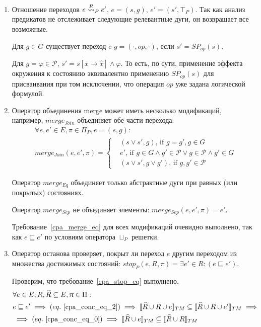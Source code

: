 \begin{enumerate}
\item Отношение переходов $e \stackrel{R}{\leadsto}_P e'$, $e = (s, g)$, $e' = (s', \top_P)$. 
Так как анализ предикатов не отслеживает следующие релевантные дуги, он возвращает все возможные. 

Для $g \in G$ существует переход c $g = (\cdot, op, \cdot)$, если $s' = SP_{op}(s)$.

Для $g = \varphi \in \mathscr{P}$, $s' = s[x \rightarrow \hat x] \land \varphi$.
То есть, по сути, применение эффекта окружения к состоянию эквивалентно применению $SP_{op}(s)$ для присваивания при том исключении, что операция $op$ уже задана логической формулой.

\item 
Оператор объединения merge может иметь несколько модификаций, например,
$merge_{Join}$ объединяет обе части перехода:
\begin{equation}
\label{predicate_merge_join_def}
\begin{aligned}
& \forall e, e' \in E, \pi \in \Pi_P, e =(s,g): \\
& merge_{Join}(e, e', \pi) = 
\begin{cases}
& (s \lor s', g) \text{, if } g = g', g \in G \\
& e' \text{, if } g \in G \land g' \in \mathscr{P} \lor g \in \mathscr{P} \land g' \in G \\
& (s \lor s', g \lor g') \text{, if } g, g' \in \mathscr{P}
\end{cases}
\end{aligned}
\end{equation}

Оператор $merge_{Eq}$ объединяет только абстрактные дуги при равных (или покрытых) состояниях.

Оператор $merge_{Sep}$ не объединяет элементы: $merge_{Sep}(e, e', \pi) = e'$.

Требование~\ref{cpa_merge_eq} для всех модификаций очевидно выполнено, так как $e \sqsubseteq e'$  по условиям оператора $\sqcup_P$ решетки.

\item Оператор останова проверяет, покрыт ли переход $e$ другим переходом из множества достижимых состояний: $stop_{P}(e, R, \pi) = \exists e'\in R: (e \sqsubseteq e')$.

Проверим, что требование~\ref{cpa_stop_eq} выполнено.
\begin{align*}
&\forall e \in E, R, \widehat{R} \subseteq E, \pi \in \Pi: \\
& e \sqsubseteq e' \implies (eq.~\ref{cpa_conc_eq_2}) \implies \conctm{\widehat{R} \cup R \cup e} \subseteq \conctm{\widehat{R} \cup R \cup e'} \implies  \\
& \implies (eq.~\ref{cpa_conc_eq_0}) \implies \conctm{\widehat{R} \cup e} \subseteq \conctm{\widehat{R} \cup R} 
\end{align*}


\end{enumerate}
